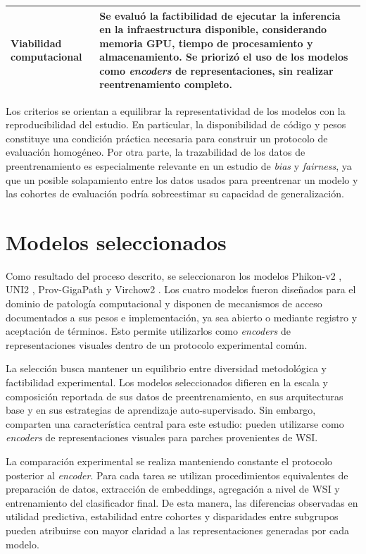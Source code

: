 \begin{table}[htbp]
\begin{tabular}{p{3.7cm} p{10.3cm}}
Viabilidad computacional &
Se evaluó la factibilidad de ejecutar la inferencia en la infraestructura disponible, considerando memoria GPU, tiempo de procesamiento y almacenamiento. Se priorizó el uso de los modelos como \textit{encoders} de representaciones, sin realizar reentrenamiento completo. \\

\bottomrule
\end{tabular}
\end{table}

Los criterios se orientan a equilibrar la representatividad de los modelos con la reproducibilidad del estudio. En particular, la disponibilidad de código y pesos constituye una condición práctica necesaria para construir un protocolo de evaluación homogéneo. Por otra parte, la trazabilidad de los datos de preentrenamiento es especialmente relevante en un estudio de \textit{bias} y \textit{fairness}, ya que un posible solapamiento entre los datos usados para preentrenar un modelo y las cohortes de evaluación podría sobreestimar su capacidad de generalización.

\section{Modelos seleccionados}
\label{sec:modelos_seleccionados}

Como resultado del proceso descrito, se seleccionaron los modelos Phikon-v2 \parencite{filiot2024phikonv2}, UNI2 \parencite{chen2024uni}, Prov-GigaPath \parencite{xu2024provgigapath} y Virchow2 \parencite{vorontsov2024virchow}. Los cuatro modelos fueron diseñados para el dominio de patología computacional y disponen de mecanismos de acceso documentados a sus pesos e implementación, ya sea abierto o mediante registro y aceptación de términos. Esto permite utilizarlos como \textit{encoders} de representaciones visuales dentro de un protocolo experimental común.

La selección busca mantener un equilibrio entre diversidad metodológica y factibilidad experimental. Los modelos seleccionados difieren en la escala y composición reportada de sus datos de preentrenamiento, en sus arquitecturas base y en sus estrategias de aprendizaje auto-supervisado. Sin embargo, comparten una característica central para este estudio: pueden utilizarse como \textit{encoders} de representaciones visuales para parches provenientes de WSI.

La comparación experimental se realiza manteniendo constante el protocolo posterior al \textit{encoder}. Para cada tarea se utilizan procedimientos equivalentes de preparación de datos, extracción de embeddings, agregación a nivel de WSI y entrenamiento del clasificador final. De esta manera, las diferencias observadas en utilidad predictiva, estabilidad entre cohortes y disparidades entre subgrupos pueden atribuirse con mayor claridad a las representaciones generadas por cada modelo.

